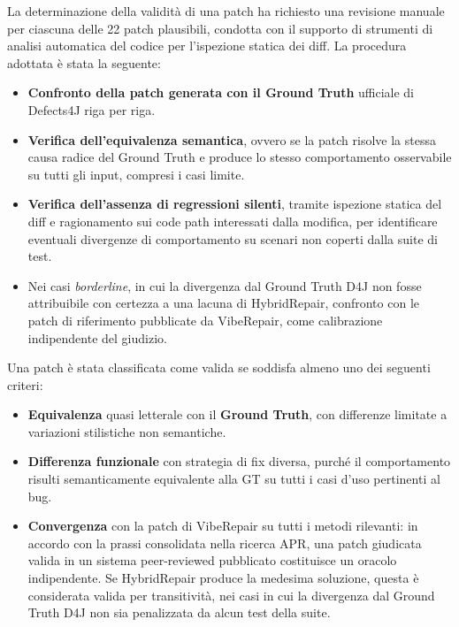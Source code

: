La determinazione della validità di una patch ha richiesto una revisione manuale
per ciascuna delle 22 patch plausibili, condotta con il supporto di strumenti di analisi
automatica del codice per l'ispezione statica dei diff. La procedura adottata è stata la seguente:

\begin{itemize}
    \item \textbf{Confronto della patch generata con il Ground Truth} ufficiale di Defects4J riga per riga.
    \item \textbf{Verifica dell'equivalenza semantica}, ovvero se la patch risolve la stessa causa radice del
    Ground Truth e produce lo stesso comportamento osservabile su tutti gli input, compresi i casi limite.
    \item \textbf{Verifica dell'assenza di regressioni silenti}, tramite ispezione statica del diff e
    ragionamento sui code path interessati dalla modifica, per identificare eventuali divergenze
    di comportamento su scenari non coperti dalla suite di test.
    \item Nei casi \textit{borderline}, in cui la divergenza dal Ground Truth D4J non fosse
    attribuibile con certezza a una lacuna di HybridRepair, confronto con le patch
    di riferimento pubblicate da VibeRepair, come calibrazione indipendente del giudizio.
\end{itemize}

Una patch è stata classificata come valida se soddisfa almeno uno dei seguenti criteri:

\begin{itemize}
    \item \textbf{Equivalenza} quasi letterale con il \textbf{Ground Truth}, con differenze limitate a variazioni
    stilistiche non semantiche.
    \item \textbf{Differenza funzionale} con strategia di fix diversa, purché il comportamento risulti
    semanticamente equivalente alla GT su tutti i casi d'uso pertinenti al bug.
    \item \textbf{Convergenza} con la patch di VibeRepair su tutti i metodi rilevanti: in accordo con la prassi
    consolidata nella ricerca APR, una patch giudicata valida in un sistema peer-reviewed pubblicato costituisce
    un oracolo indipendente. Se HybridRepair produce la medesima soluzione, questa è considerata valida
    per transitività, nei casi in cui la divergenza dal Ground Truth D4J non sia penalizzata da alcun test della suite.
\end{itemize}

